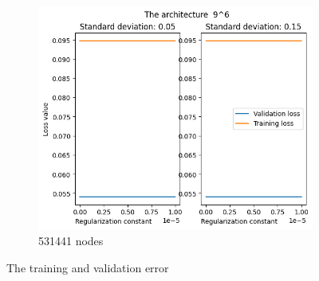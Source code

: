 \documentclass[a4paper]{article}
\begin{document}
\begin{figure}[ht]
    \begin{subfigure}{0.4\textwidth}
        \centering
        \includegraphics[width=\textwidth]{Labs/Lab 1/Lab 1b/Part2/figure/5-9.png}
        \caption{531441 nodes}
    \end{subfigure}
    \hfill
    \caption{The training and validation error}
    \label{fig:different-hidden-neurons}
\end{figure}
\end{document}
